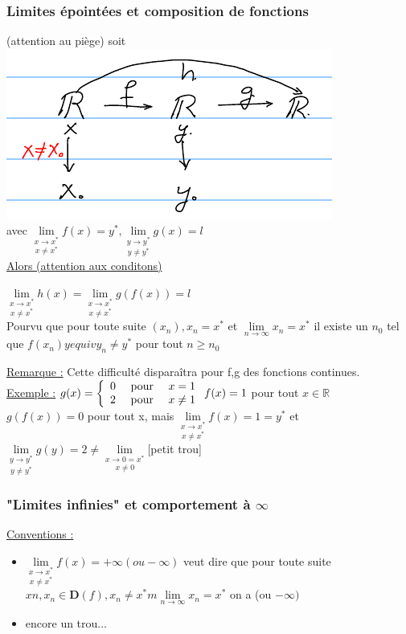 \documentclass[12pt,a4paper]{article}
\newcommand{\limite}{\lim\limits_}
\newcommand{\ninf}{\ensuremath{n \to \infty}}
\newcommand{\R}{\ensuremath{\mathbb{R}} }
\newcommand{\pour}{\mbox{ pour }}
\begin{document}
{\subsubsection{Limites épointées et composition de fonctions}
(attention au piège)
soit \includegraphics[scale=0.5]{illustrations_Analyse/compo}\\
avec $\underset{x \neq x^*}{\limite{x \to x^*}} f(x )= y^*, \underset{y \neq y^*}{\limite{y \to y^*}} g(x) = l$\\
\underline{Alors (attention aux conditons)}
\begin{boite}
$\underset{x \neq x^*}{\limite{x \to x^*}} h(x) = \underset{x \neq x^*}{\limite{x \to x^*}} g(f(x)) = l$\\
Pourvu que pour toute suite $(x_n), x_n = x^*$ et $\limite{\ninf} x_n = x^*$ il existe un $n_0$ tel que $f(x_n) yequiv y_n \neq y^*$ pour tout $n \geq n_0$
\end{boite}
\underline{Remarque :} Cette difficulté disparaîtra pour f,g des fonctions continues.\\
\underline{Exemple :} $g(x) =
\left\{
\begin{array}{lll}
0 & \pour & x = 1\\
2 & \pour & x \neq 1
\end{array}
\right.\\
f(x) = 1$ pour tout $x \in \R$\\
$g(f(x)) = 0$ pour tout x, mais $\underset{x \neq x^*}{\limite{x \to x^*}} f(x) = 1 = y^*$ et $\underset{y \neq y^*}{\limite{y \to y^*}} g(y) = 2 \neq \underset{x \neq 0}{\limite{x \to 0 = x^*}}$[petit trou]\\
\subsubsection{"Limites infinies" et comportement à $\infty$}
\underline{Conventions :}
\begin{itemize}
\item $\underset{x \neq x^*}{\limite{x \to x^*}} f(x) = +\infty (ou -\infty)$ veut dire que pour toute suite $xn, x_n \in \mathbf{D}(f), x_n \neq x^*m \limite{\ninf} x_n = x^*$ on a 
(ou $-\infty)$
\item {encore un trou...}
\end{itemize}
}
\end{document}
